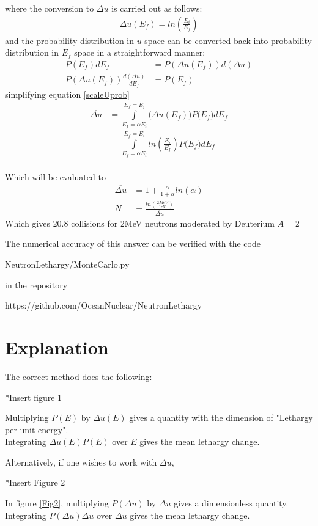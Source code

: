 \documentclass[a4paper, 12pt]{article}
\begin{document}
where the conversion to $\Delta u$ is carried out as follows:
\begin{align}
	\Delta u (E_f) = ln\left(\frac{E_i}{E_f} \right)
\end{align}
and the probability distribution in $u$ space can be converted back into probability distribution in $E_f$ space in a straightforward manner:
\begin{align}
	P(E_f) dE_f &= P(\Delta u (E_f) ) {d(\Delta u)}	\\
	P(\Delta u (E_f) ) \frac{d(\Delta u)}{dE_f} &= P(E_f)
\end{align}
simplifying equation \ref{scaleUprob}
\begin{align}
	\overline{\Delta u} &=	\int\limits_{E_f=\alpha E_i}^{E_f=E_i} \big(\Delta u (E_f) \big) P\big(E_f \big) dE_f	\\
						&=	\int\limits_{E_f=\alpha E_i}^{E_f=E_i} ln \left( \frac{E_i}{E_f} \right) P\big(E_f \big) dE_f \\
\end{align}

Which will be evaluated to
\begin{align}
	\overline{\Delta u} &=	1+\frac{\alpha}{1+\alpha} ln(\alpha)	\\
	N &= \frac{ ln \left( \frac{2 MeV}{1eV} \right)} { \overline{\Delta u} }
\end{align}
Which gives 20.8 collisions for 2MeV neutrons moderated by Deuterium $A=2$

The numerical accuracy of this answer can be verified with the code

NeutronLethargy/MonteCarlo.py

in the repository 

https://github.com/OceanNuclear/NeutronLethargy

\section{Explanation}
	The correct method does the following:
	
	*Insert figure 1
	
	Multiplying $P(E)$ by $\Delta u(E)$ gives a quantity with the dimension of "Lethargy per unit energy".\\
	Integrating $\Delta u(E) P(E)$ over $E$ gives the mean lethargy change.

	
	Alternatively, if one wishes to work with $\Delta u$,
	
	*Insert Figure 2
	
	In figure \ref{Fig2}, multiplying $P(\Delta u)$ by $\Delta u$ gives a dimensionless quantity. \\
	Integrating $P(\Delta u) \Delta u$ over $\Delta u$ gives the mean lethargy change.
	
\end{document}
